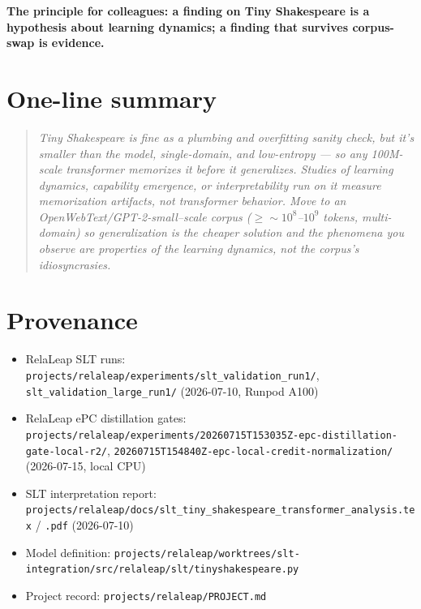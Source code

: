\documentclass[11pt]{article}
\begin{document}
\textbf{The principle for colleagues: a finding on Tiny Shakespeare is a hypothesis about learning dynamics; a finding that survives corpus-swap is evidence.}

\section{One-line summary}

\begin{quote}
\emph{Tiny Shakespeare is fine as a plumbing and overfitting sanity check, but it's smaller than the model, single-domain, and low-entropy --- so any 100M-scale transformer memorizes it before it generalizes. Studies of learning dynamics, capability emergence, or interpretability run on it measure memorization artifacts, not transformer behavior. Move to an OpenWebText/GPT-2-small--scale corpus ($\geq\sim10^8$--$10^9$ tokens, multi-domain) so generalization is the cheaper solution and the phenomena you observe are properties of the learning dynamics, not the corpus's idiosyncrasies.}
\end{quote}

\section*{Provenance}

\begin{itemize}[leftmargin=*]
\item RelaLeap SLT runs: \texttt{projects/relaleap/experiments/slt\_validation\_run1/}, \texttt{slt\_validation\_large\_run1/} (2026-07-10, Runpod A100)
\item RelaLeap ePC distillation gates: \texttt{projects/relaleap/experiments/20260715T153035Z-epc-distillation-gate-local-r2/}, \texttt{20260715T154840Z-epc-local-credit-normalization/} (2026-07-15, local CPU)
\item SLT interpretation report: \texttt{projects/relaleap/docs/slt\_tiny\_shakespeare\_transformer\_analysis.tex} / \texttt{.pdf} (2026-07-10)
\item Model definition: \texttt{projects/relaleap/worktrees/slt-integration/src/relaleap/slt/tinyshakespeare.py}
\item Project record: \texttt{projects/relaleap/PROJECT.md}
\end{itemize}
\end{document}
